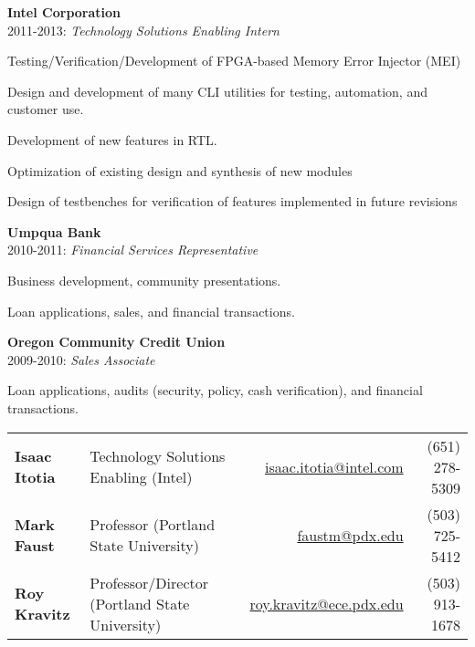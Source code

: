 \documentclass{article}
\begin{document}
	\hspace{-10pt}
	\textbf{Intel Corporation}\\2011-2013: \textit{Technology Solutions Enabling Intern}
	\begin{tight}
			\item Testing/Verification/Development of FPGA-based Memory Error Injector (MEI)
		\item Design and development of many CLI utilities for testing, automation, and customer use.
		\item Development of new features in RTL. 
		\item Optimization of existing design and synthesis of new modules
		\item Design of testbenches for verification of features implemented in future revisions
	\end{tight} 

	\textbf{Umpqua Bank}\\2010-2011: \textit{Financial Services Representative}
	\begin{tight}
		\item Business development, community presentations.
		\item Loan applications, sales, and financial transactions.
	\end{tight}

	\textbf{Oregon Community Credit Union}\\ 2009-2010: \textit{Sales Associate}
	\begin{tight}
		\item Loan applications, audits (security, policy, cash verification), and financial transactions.
	\end{tight}


\vspace*{-9pt}
\begin{tabular}{llrr}
	\textbf{Isaac Itotia} & Technology Solutions Enabling (Intel) & \url{isaac.itotia@intel.com} & (651) 278-5309 \\
	\textbf{Mark Faust} & Professor (Portland State University) & \url{faustm@pdx.edu} & (503) 725-5412\\
	\textbf{Roy Kravitz} & Professor/Director (Portland State University) & \url{roy.kravitz@ece.pdx.edu} & (503) 913-1678\\ 
\end{tabular}
\end{document}
